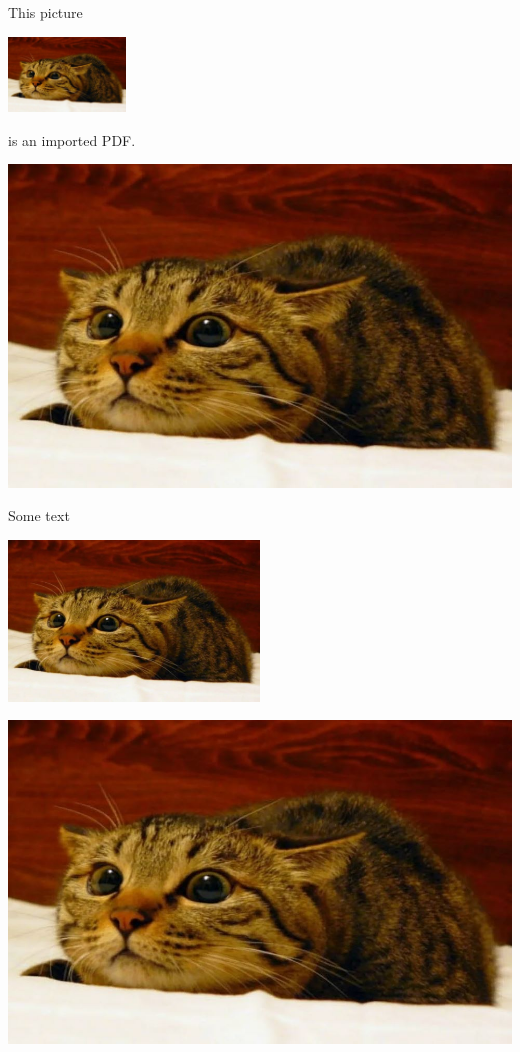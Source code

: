 \documentclass{article}
\begin{document}
This picture
\begin{center}
\includegraphics[height=2cm]{cat}
\end{center}
is an imported PDF.

\begin{center}
\includegraphics[height = 0.5\textheight]{cat}
\end{center}

Some text
\begin{center}
\includegraphics[width = 0.5\textwidth]{cat}
\end{center}

\begin{center}
\includegraphics[width = 0.5\linewidth]{cat}
\end{center}
\end{document}
